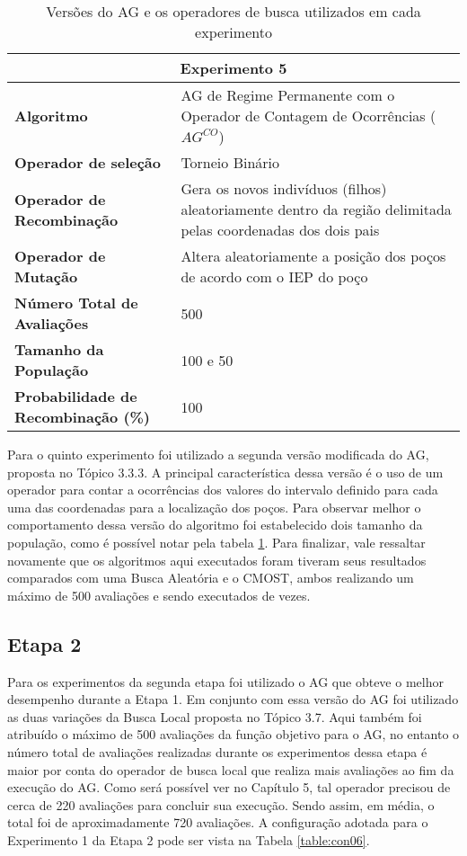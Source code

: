 \begin{table}[H]
\centering
\caption{Versões do AG e os operadores de busca utilizados em cada experimento}
\label{table:con05}
\begin{tabular}{|p{6cm}|p{9cm}|}
\hline
 
 \multicolumn{2}{|c|}{\textbf{Experimento 5}} \\ \hline
\textbf{Algoritmo} &AG de Regime Permanente com o Operador de Contagem de Ocorrências ($AG^{CO}$) \\ \hline
\textbf{Operador de seleção} & Torneio Binário \\ \hline
\textbf{Operador de Recombinação} & Gera os novos indivíduos (filhos) aleatoriamente dentro da região delimitada pelas coordenadas dos dois pais \\  \hline
\textbf{Operador de Mutação} & Altera aleatoriamente a posição dos poços de acordo com o IEP do poço \\ \hline
\textbf{Número Total de Avaliações} & 500 \\ \hline
\textbf{Tamanho da População} & 100 e 50 \\ \hline
\textbf{Probabilidade de Recombinação (\%)} & 100 \\ \hline
\end{tabular}
\end{table} 

Para o quinto experimento foi utilizado a segunda versão modificada do AG, proposta no Tópico 3.3.3. A principal característica dessa versão é o uso de um operador para contar a ocorrências dos valores do intervalo definido para cada uma das coordenadas para a localização dos poços. Para observar melhor o comportamento dessa versão do algoritmo foi estabelecido dois tamanho da população, como é possível notar pela tabela \ref{table:con05}. Para finalizar, vale ressaltar novamente que os algoritmos aqui executados foram tiveram seus resultados comparados com uma Busca Aleatória e o CMOST, ambos realizando um  máximo de 500 avaliações e sendo executados de vezes.

\subsection{Etapa 2}
\label{ch:4_Etapa2}
Para os experimentos da segunda etapa foi utilizado o AG que obteve o melhor desempenho durante a Etapa 1. Em conjunto com essa versão do AG foi utilizado as duas variações da Busca Local proposta no Tópico 3.7. Aqui também foi atribuído o máximo de 500 avaliações da função objetivo  para o AG, no entanto o número total de avaliações realizadas durante os experimentos dessa etapa é maior por conta do operador de busca local que realiza mais avaliações ao fim da execução do AG. Como será possível ver no Capítulo 5, tal operador precisou de cerca de 220 avaliações para concluir sua execução. Sendo assim, em média, o total foi de aproximadamente 720 avaliações. A configuração adotada para o Experimento 1 da Etapa 2 pode ser vista na Tabela \ref{table:con06}.

